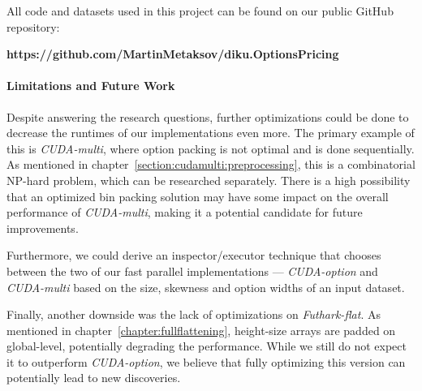 All code and datasets used in this project can be found on our public GitHub repository:
\begin{center}
\textbf{https://github.com/MartinMetaksov/diku.OptionsPricing}
\end{center}


\paragraph{Limitations and Future Work}
Despite answering the research questions, further optimizations could be done to decrease the runtimes of our implementations even more. The primary example of this is \textit{CUDA-multi}, where option packing is not optimal and is done sequentially. As mentioned in chapter~\ref{section:cudamulti:preprocessing}, this is a combinatorial NP-hard problem, which can be researched separately. There is a high possibility that an optimized bin packing solution may have some impact on the overall performance of \textit{CUDA-multi}, making it a potential candidate for future improvements. 

Furthermore, we could derive an inspector/executor technique that chooses between the two of our fast parallel implementations --- \textit{CUDA-option} and \textit{CUDA-multi} based on the size, skewness and option widths of an input dataset.


Finally, another downside was the lack of optimizations on \textit{Futhark-flat}. As mentioned in chapter~\ref{chapter:fullflattening}, height-size arrays are padded on global-level, potentially degrading the performance. While we still do not expect it to outperform \textit{CUDA-option}, we believe that fully optimizing this version can potentially lead to new discoveries. 

